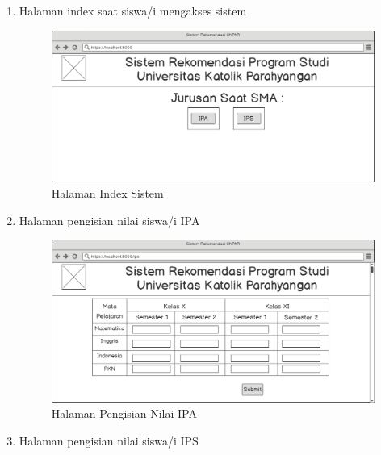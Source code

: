 \begin{enumerate}
    \item Halaman index saat siswa/i mengakses sistem
    
    \begin{figure}[H]
        \centering
        \includegraphics[width = 12cm, height =8 cm]{Gambar/gambar41.png}
        \caption{Halaman Index Sistem}
        \label{fig:gambar41}
    \end{figure}
    
    \item Halaman pengisian nilai siswa/i IPA
    
    \begin{figure}[H]
        \centering
        \includegraphics[width = 12cm, height =8 cm]{Gambar/gambar42.png}
        \caption{Halaman Pengisian Nilai IPA}
        \label{fig:gambar42}
    \end{figure}
    
    \item Halaman pengisian nilai siswa/i IPS
    

\end{enumerate}

